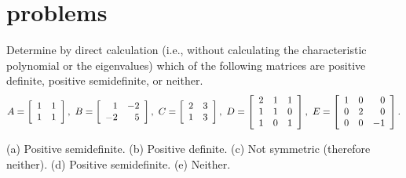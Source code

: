 \documentclass{ximera}
\author{Zack Reed}
\begin{document}
\section*{problems}

\begin{problem}
  Determine by direct calculation (i.e., without calculating the
  characteristic polynomial or the eigenvalues) which of the following
  matrices are positive definite, positive semidefinite, or neither.
  \begin{equation*}
    A = \startmat{rr}
      1 & 1 \\
      1 & 1 \\
    \stopmat,\quad
    B = \startmat{rr}
      1  & -2 \\
      -2 &  5 \\
    \stopmat,\quad
    C = \startmat{rr}
      2 & 3 \\
      1 & 3 \\
    \stopmat,\quad
    D = \startmat{rrr}
      2 & 1 & 1 \\
      1 & 1 & 0 \\
      1 & 0 & 1 \\
    \stopmat,\quad
    E = \startmat{rrr}
      1 & 0 &  0 \\
      0 & 2 &  0 \\
      0 & 0 & -1 \\
    \stopmat.
  \end{equation*}
  \begin{solution}
    (a) Positive semidefinite. (b) Positive definite. (c) Not
    symmetric (therefore neither). (d) Positive semidefinite. (e)
    Neither.
  \end{solution}
\end{problem}
\end{document}
